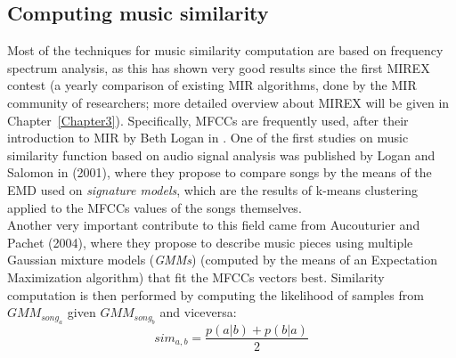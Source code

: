 \subsection*{Computing music similarity}
Most of the techniques for music similarity computation are based on frequency spectrum analysis, as this has shown very good results since the first MIREX contest (a yearly comparison of existing MIR algorithms, done by the MIR community of researchers; more detailed overview about MIREX will be given in Chapter~\ref{Chapter3}). Specifically, MFCCs are frequently used, after their introduction to MIR by Beth Logan in \cite{logan00}. One of the first studies on music similarity function based on audio signal analysis was published by Logan and Salomon in \cite{logan01} (2001), where they propose to compare songs by the means of the EMD used on \textit{signature models}, which are the results of k-means clustering applied to the MFCCs values of the songs themselves.\\ Another very important contribute to this field came from Aucouturier and Pachet \cite{aucou02} (2004), where they propose to describe music pieces using multiple Gaussian mixture models (\textit{GMMs}) (computed by the means of an Expectation Maximization algorithm) that fit the MFCCs vectors best. Similarity computation is then performed by computing the likelihood of samples from $GMM_{song_a}$ given $GMM_{song_b}$ and viceversa:
\begin{equation}
sim_{a,b} = \frac{p(a|b) + p(b|a)}{2}
\end{equation}

